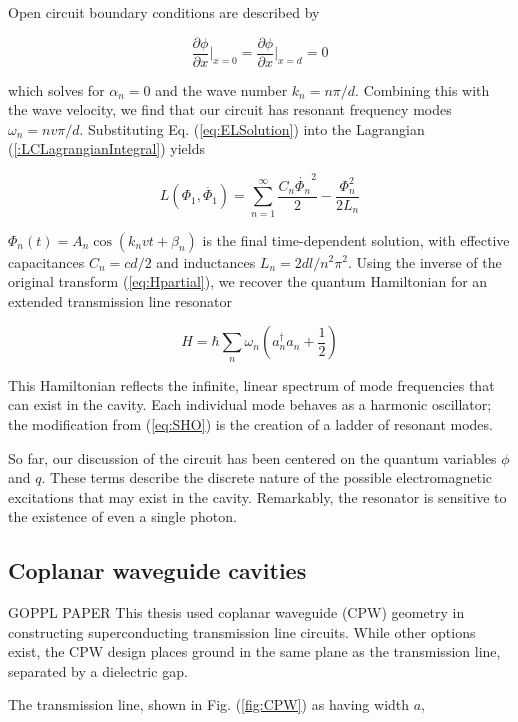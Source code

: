 \documentclass[12 pt]{book}
\begin{document}
Open circuit boundary conditions are described by 

\begin{equation}
\frac{\partial\phi}{\partial x}\bigg|_{x=0}=\frac{\partial\phi}{\partial x}\bigg|_{x=d}=0
\end{equation}

which solves for $\alpha_n=0$ and the wave number $k_n=n\pi/d$. Combining this with the wave velocity, we find that our circuit has resonant frequency modes $\omega_n=nv\pi/d$. Substituting Eq. (\ref{eq:ELSolution}) into the Lagrangian (\ref{:LCLagrangianIntegral})  yields 

\begin{equation}
L(\Phi_1, \dot{\Phi_1})=\sum_{n=1}^\infty\frac{C_n\dot{\Phi_n}^2}{2}-\frac{\Phi_n^2}{2L_n}
\end{equation}

$\Phi_n(t)=A_n\cos(k_nvt+\beta_n)$ is the final time-dependent solution, with effective capacitances $C_n=cd/2$ and inductances $L_n=2dl/n^2\pi^2$. Using the inverse of the original transform (\ref{eq:Hpartial}), we recover the quantum Hamiltonian for an extended transmission line resonator 

\begin{equation}
H=\hbar\sum_n \omega_n (a^\dag_n a_n + \frac{1}{2})
\end{equation}

This Hamiltonian reflects the infinite, linear spectrum of mode frequencies that can exist in the cavity. Each individual mode behaves as a harmonic oscillator; the modification from (\ref{eq:SHO}) is the creation of a ladder of resonant modes.

 So far, our discussion of the circuit has been centered on the quantum variables $\phi$ and $q$. These terms describe the discrete nature of the possible electromagnetic excitations that may exist in the cavity. Remarkably, the resonator is sensitive to the existence of even a single photon. 

\subsection{Coplanar waveguide cavities}
GOPPL PAPER
This thesis used coplanar waveguide (CPW) geometry in constructing superconducting transmission line circuits. While other options exist, the CPW design places ground in the same plane as the transmission line, separated by a dielectric gap. 

The transmission line, shown in Fig. (\ref{fig:CPW}) as having width $a$, 
\end{document}
